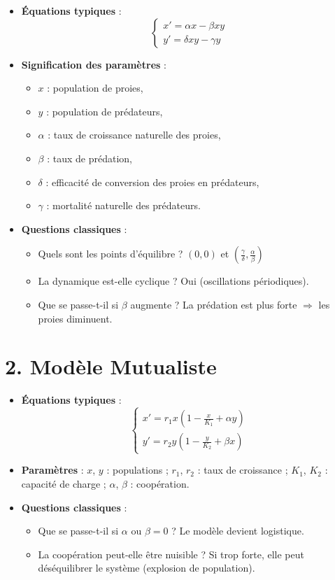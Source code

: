 \documentclass{article}
\begin{document}
\begin{itemize}
  \item \textbf{Équations typiques} :
  \[
  \begin{cases}
  x' = \alpha x - \beta xy \\
  y' = \delta xy - \gamma y
  \end{cases}
  \]
  \item \textbf{Signification des paramètres} :
  \begin{itemize}
    \item $x$ : population de proies,
    \item $y$ : population de prédateurs,
    \item $\alpha$ : taux de croissance naturelle des proies,
    \item $\beta$ : taux de prédation,
    \item $\delta$ : efficacité de conversion des proies en prédateurs,
    \item $\gamma$ : mortalité naturelle des prédateurs.
  \end{itemize}
  \item \textbf{Questions classiques} :
  \begin{itemize}
    \item Quels sont les points d’équilibre ? $(0,0)$ et $\left(\frac{\gamma}{\delta}, \frac{\alpha}{\beta}\right)$
    \item La dynamique est-elle cyclique ? Oui (oscillations périodiques).
    \item Que se passe-t-il si $\beta$ augmente ? La prédation est plus forte $\Rightarrow$ les proies diminuent.
  \end{itemize}
\end{itemize}

\section*{2. Modèle Mutualiste}

\begin{itemize}
  \item \textbf{Équations typiques} :
  \[
  \begin{cases}
  x' = r_1 x \left(1 - \frac{x}{K_1} + \alpha y\right) \\
  y' = r_2 y \left(1 - \frac{y}{K_2} + \beta x\right)
  \end{cases}
  \]
  \item \textbf{Paramètres} :
  $x$, $y$ : populations ; $r_1$, $r_2$ : taux de croissance ; $K_1$, $K_2$ : capacité de charge ; $\alpha$, $\beta$ : coopération.
  \item \textbf{Questions classiques} :
  \begin{itemize}
    \item Que se passe-t-il si $\alpha$ ou $\beta = 0$ ? Le modèle devient logistique.
    \item La coopération peut-elle être nuisible ? Si trop forte, elle peut déséquilibrer le système (explosion de population).
  \end{itemize}
\end{itemize}
\end{document}
